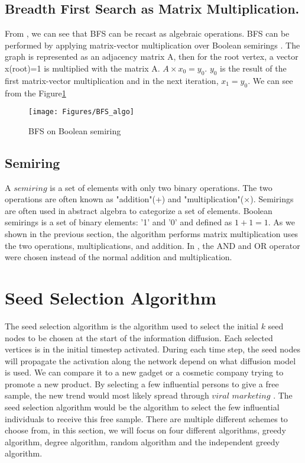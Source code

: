 \subsection{Breadth First Search as Matrix Multiplication.} \label{BFS as Matrix}
From  \cite{AlgoToMath}, we can see that BFS can be recast as algebraic operations. BFS can be performed by applying matrix-vector multiplication over Boolean semirings \cite{HybridBFS2015}. The graph is represented as an adjacency matrix A, then for the root vertex, a vector x(root)=1 is multiplied with the matrix A. $A \times x_0 = y_0$. $y_0$ is the result of the first matrix-vector multiplication and in the next iteration, $x_1 = y_0$. We can see from the Figure\ref{fig:bfsMatrix}

\begin{figure}
    \texttt{[image: Figures/BFS\_algo]}
    \caption{BFS on Boolean semiring}
    \label{fig:bfsMatrix}
\end{figure}

\subsection{Semiring}
A $semiring$ is a set of elements with only two binary operations. The two operations are often known as "addition"(+) and "multiplication"($\times$). Semirings are often used in abstract algebra to categorize a set of elements. Boolean semirings is a set of binary elements: '1' and '0' and defined as $1+1=1$.  As we shown in the previous section, the algorithm performs matrix multiplication uses the two operations, multiplications, and addition. In  \cite{HybridBFS2015}, the AND and OR operator were chosen instead of the normal addition and multiplication. 

 
 
\section{Seed Selection Algorithm}
The seed selection algorithm is the algorithm used to select the initial $k$ seed nodes to be chosen at the start of the information diffusion. Each selected vertices is in the initial timestep activated. During each time step, the seed nodes will propagate the activation along the network depend on what diffusion model is used. We can compare it to a new gadget or a cosmetic company trying to promote a new product. By selecting a few influential persons to give a free sample, the new trend would most likely spread through $viral$ $marketing$ \cite{ViralMarketing}. The seed selection algorithm would be the algorithm to select the few influential individuals to receive this free sample. There are multiple different schemes to choose from, in this section, we will focus on four different algorithms, greedy algorithm, degree algorithm, random algorithm and the independent greedy algorithm.

